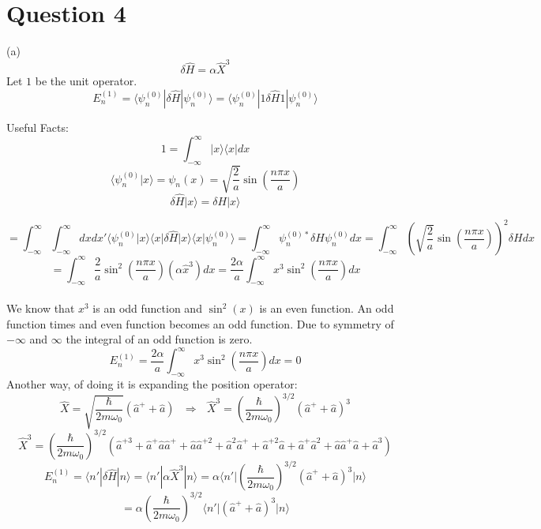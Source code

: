 \documentclass[11pt]{article}
\def\h{\hbar}
\def\w{\omega}
\def\la{\langle}
\def\ra{\rangle}
\def\sp{\vspace{3mm}}
\renewcommand{\hat}{\widehat}
\theoremstyle{pink}
\theoremstyle{boxedsolution}
\theoremstyle{definition}
\theoremstyle{claim}
\begin{document}
 \section*{Question 4}
(a)
\[\delta\hat{H}=\alpha\hat{X}^3\]
Let $1$ be the unit operator.
\sp
\[E_n^{(1)}=\la \psi_n^{(0)}|\delta \hat{H}|\psi_n^{(0)}\ra = 
\la \psi_n^{(0)}|1 \delta \hat{H} 1|\psi_n^{(0)}\ra  \]
\sp
\begin{tcolorbox}
Useful Facts:
\sp
\[1 = \int^\infty_{-\infty}|x\ra\la x|dx\]
\sp
\[\la \psi^{(0)}_n|x\ra = \psi_n(x)=\sqrt{\frac{2}{a}}\sin{\left(\frac{n\pi x}{a}\right)}\]
\sp
\[\delta\hat{H}|x\ra=\delta H |x\ra\]
\end{tcolorbox}
\[=\int^\infty_{-\infty}\int^\infty_{-\infty}dxdx'\la \psi_n^{(0)}|x\ra \la x |\delta \hat{H}|x\ra\la x|\psi_n^{(0)}\ra=\int^\infty_{-\infty}\psi_n^{(0)*}\delta H\psi_n^{(0)}dx=
\int^\infty_{-\infty}\left(\sqrt{\frac{2}{a}}\sin\left(\frac{n\pi x}{a}\right)\right)^2\delta Hdx\]
\sp
\[=\int^\infty_{-\infty}\frac{2}{a}\sin^2\left(\frac{n\pi x}{a}\right)\left(\alpha\hat{x}^3\right)dx
=\frac{2\alpha}{a}\int^{\infty}_{-\infty}x^3\sin^2\left(\frac{n\pi x}{a}\right)dx\]
\sp
\\We know that $x^3$ is an odd function and $\sin^2(x)$ is an even function. An odd function times and even function becomes an odd function. Due to symmetry of $-\infty$ and $\infty$ the integral of an odd function is zero.
\[E_n^{(1)}=\frac{2\alpha}{a}\int^{\infty}_{-\infty}x^3\sin^2\left(\frac{n\pi x}{a}\right)dx=0\]
\sp
Another way, of doing it is expanding the position operator:
\[\hat{X}=\sqrt{\frac{\h}{2m\w_0}}\left(\hat{a}^++\hat{a}\right) \text{  } \Rightarrow \text{ } \hat{X}^3=\left(\frac{\h}{2m\w_0}\right)^{3/2}\left(\hat{a}^++\hat{a}\right)^3\]
\sp
\[\hat{X}^3=\left(\frac{\h}{2m\w_0}\right)^{3/2}\left(\hat{a}^{+3}+\hat{a}^{+}\hat{a}\hat{a}^{+}+\hat{a}\hat{a}^{+2}+\hat{a}^{2}\hat{a}^{+}+\hat{a}^{+2}\hat{a}+\hat{a}^{+}\hat{a}^{2}+\hat{a}\hat{a}^{+}\hat{a}+\hat{a}^{3}\right)\]
\sp
\[E_n^{(1)}=\la n'|\delta \hat{H}|n\ra = \la n'|\alpha \hat{X}^3|n\ra = \alpha\Bigg\la n'\Bigg|\left(\frac{\h}{2m\w_0}\right)^{3/2}\left(\hat{a}^++\hat{a}\right)^3\Bigg|n\Bigg\rangle \]
\sp
\[= \alpha\left(\frac{\h}{2m\w_0}\right)^{3/2}\Big\la n'\Big|\left(\hat{a}^++\hat{a}\right)^3\Big|n\Big\ra\]
\newpage
\end{document}
